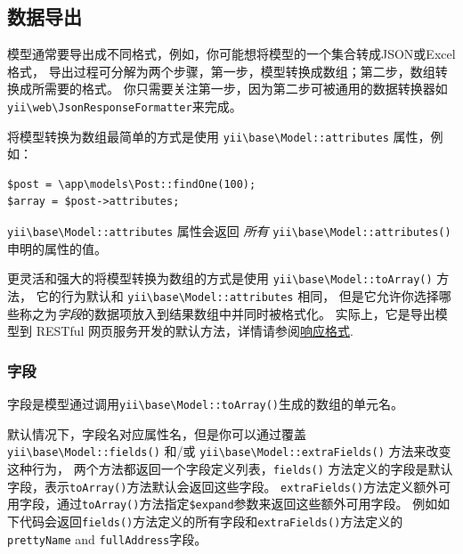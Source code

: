 \subsection{数据导出 \label{structure-models.md::data-exporting}}
模型通常要导出成不同格式，例如，你可能想将模型的一个集合转成JSON或Excel格式，
导出过程可分解为两个步骤，第一步，模型转换成数组；第二步，数组转换成所需要的格式。
你只需要关注第一步，因为第二步可被通用的数据转换器如\texttt{yii{\allowbreak{}\textbackslash}web{\allowbreak{}\textbackslash}JsonResponseFormatter}来完成。

将模型转换为数组最简单的方式是使用 \texttt{yii{\allowbreak{}\textbackslash}base{\allowbreak{}\textbackslash}Model\allowbreak{}::\allowbreak{}attributes} 属性，例如：

\lstset{language=php}\begin{lstlisting}
$post = \app\models\Post::findOne(100);
$array = $post->attributes;
\end{lstlisting}
\texttt{yii{\allowbreak{}\textbackslash}base{\allowbreak{}\textbackslash}Model\allowbreak{}::\allowbreak{}attributes} 属性会返回 \textit{所有} \texttt{yii{\allowbreak{}\textbackslash}base{\allowbreak{}\textbackslash}Model\allowbreak{}::\allowbreak{}attributes()} 申明的属性的值。

更灵活和强大的将模型转换为数组的方式是使用 \texttt{yii{\allowbreak{}\textbackslash}base{\allowbreak{}\textbackslash}Model\allowbreak{}::\allowbreak{}toArray()} 方法，
它的行为默认和 \texttt{yii{\allowbreak{}\textbackslash}base{\allowbreak{}\textbackslash}Model\allowbreak{}::\allowbreak{}attributes} 相同，
但是它允许你选择哪些称之为\textit{字段}的数据项放入到结果数组中并同时被格式化。
实际上，它是导出模型到 RESTful 网页服务开发的默认方法，详情请参阅\hyperref[rest-response-formatting.md]{响应格式}.

\subsubsection{字段 \label{structure-models.md::fields}}
字段是模型通过调用\texttt{yii{\allowbreak{}\textbackslash}base{\allowbreak{}\textbackslash}Model\allowbreak{}::\allowbreak{}toArray()}生成的数组的单元名。

默认情况下，字段名对应属性名，但是你可以通过覆盖
\texttt{yii{\allowbreak{}\textbackslash}base{\allowbreak{}\textbackslash}Model\allowbreak{}::\allowbreak{}fields()} 和/或 \texttt{yii{\allowbreak{}\textbackslash}base{\allowbreak{}\textbackslash}Model\allowbreak{}::\allowbreak{}extraFields()} 方法来改变这种行为，
两个方法都返回一个字段定义列表，\lstinline|fields()| 方法定义的字段是默认字段，表示\lstinline|toArray()|方法默认会返回这些字段。 
\lstinline|extraFields()|方法定义额外可用字段，通过\lstinline|toArray()|方法指定\lstinline|$expand|参数来返回这些额外可用字段。
例如如下代码会返回\lstinline|fields()|方法定义的所有字段和\lstinline|extraFields()|方法定义的\lstinline|prettyName| and \lstinline|fullAddress|字段。

